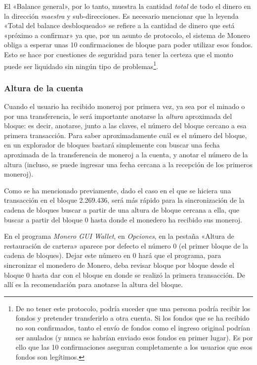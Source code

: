 \documentclass[12pt,a4paper,twoside]{book}
\begin{document}
El «Balance general», por lo tanto, muestra la cantidad \textit{total} de todo el dinero en la dirección \textit{maestra} y sub-direcciones. Es necesario mencionar que la leyenda «Total del balance desbloqueado» se refiere a la cantidad de dinero que está «próximo a confirmar» ya que, por un asunto de protocolo, el sistema de Monero obliga a esperar unas 10 confirmaciones de bloque para poder utilizar esos fondos. Esto se hace por cuestiones de seguridad para tener la certeza que el monto puede ser liquidado sin ningún tipo de problemas\footnote{De no tener este protocolo, podría suceder que una persona podría recibir los fondos y pretender transferirlo a otra cuenta. Si los fondos que se ha recibido no son confirmados, tanto el envío de fondos como el ingreso original podrían ser anulados (y nunca se habrían enviado esos fondos en primer lugar). Es por ello que las 10 confirmaciones aseguran completamente a los usuarios que esos fondos son legítimos.}.

\subsubsection{Altura de la cuenta}
Cuando el usuario ha recibido moneroj por primera vez, ya sea por el minado o por una transferencia, le será importante anotarse la \textit{altura} aproximada del bloque: es decir, anotarse, junto a las claves, el número del bloque cercano a esa primera transacción. Para saber aproximadamente cuál es el número del bloque, en un explorador de bloques bastará simplemente con buscar una fecha aproximada de la transferencia de moneroj a la cuenta, y anotar el número de la altura (incluso, se puede ingresar una fecha cercana a la recepción de los primeros moneroj).

Como se ha mencionado previamente, dado el caso en el que se hiciera una transacción en el bloque 2.269.436, será más rápido para la sincronización de la cadena de bloques buscar a partir de una altura de bloque cercana a ella, que buscar a partir del bloque 0 hasta donde el monedero ha recibido sus moneroj.

En el programa \textit{Monero GUI Wallet}, en \textit{Opciones}, en la pestaña «Altura de restauración de cartera» aparece por defecto el número 0 (el primer bloque de la cadena de bloques). Dejar este número en 0 hará que el programa, para sincronizar el monedero de Monero, deba revisar bloque por bloque desde el bloque 0 hasta dar con el bloque en donde se realizó la primera transacción. De allí es la recomendación para anotarse la altura del bloque.
\end{document}
